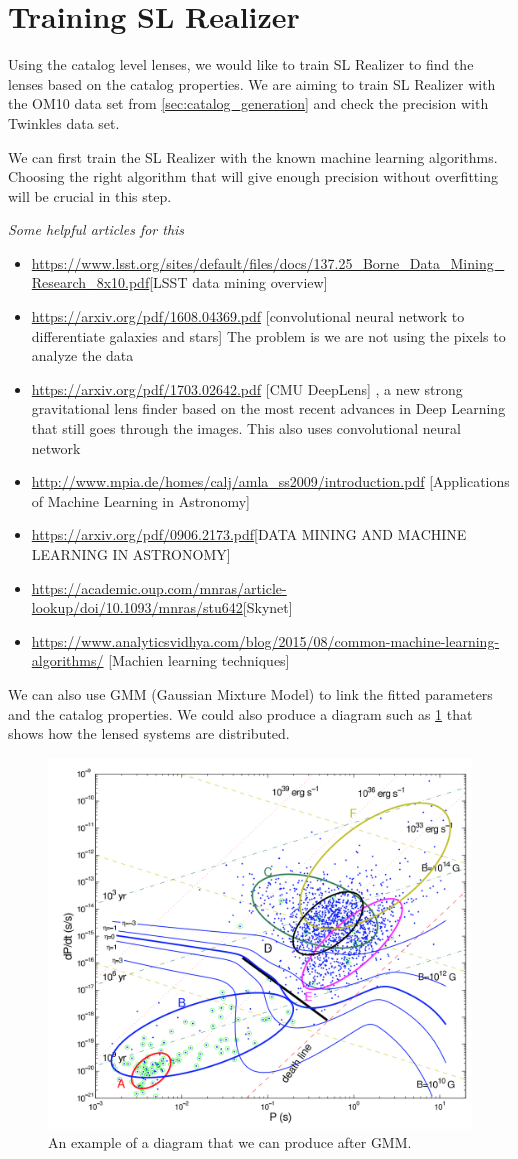 \documentclass[\docopts]{\docclass}
\begin{document}
\section{Training SL Realizer}
\label{sec:sl_realizer_train}

Using the catalog level lenses, we would like to train SL Realizer to find the lenses based on the catalog properties. We are aiming to train SL Realizer with the OM10 data set from \ref{sec:catalog_generation} and check the precision with Twinkles data set. 

We can first train the SL Realizer with the known machine learning algorithms. Choosing the right algorithm that will give enough precision without overfitting will be crucial in this step. 

\textit{Some helpful articles for this}

\begin{itemize}
  \item \url{https://www.lsst.org/sites/default/files/docs/137.25_Borne_Data_Mining_Research_8x10.pdf}[LSST data mining overview]
 \item \url{https://arxiv.org/pdf/1608.04369.pdf} [convolutional neural network to differentiate galaxies and stars] The problem is we are not using the pixels to analyze the data
 \item \url{https://arxiv.org/pdf/1703.02642.pdf} [CMU DeepLens] , a new strong gravitational lens finder based on the most recent advances in Deep Learning that still goes through the images. This also uses convolutional neural network
  \item \url{http://www.mpia.de/homes/calj/amla_ss2009/introduction.pdf} [Applications of Machine Learning in Astronomy]
  \item \url{https://arxiv.org/pdf/0906.2173.pdf}[DATA MINING AND MACHINE LEARNING IN ASTRONOMY]
  \item \url{https://academic.oup.com/mnras/article-lookup/doi/10.1093/mnras/stu642}[Skynet]
  \item \url{https://www.analyticsvidhya.com/blog/2015/08/common-machine-learning-algorithms/} [Machien learning techniques]
  
\end{itemize}

We can also use GMM (Gaussian Mixture Model) to link the fitted parameters and the catalog properties. We could also produce a diagram such as \ref{fig:example} that shows how the lensed systems are distributed.

\begin{figure}
\includegraphics[width=0.3\columnwidth]{PPDiagram.png}
\caption{An example of a diagram that we can produce after GMM.}
 \label{fig:example}
\end{figure}
\end{document}
